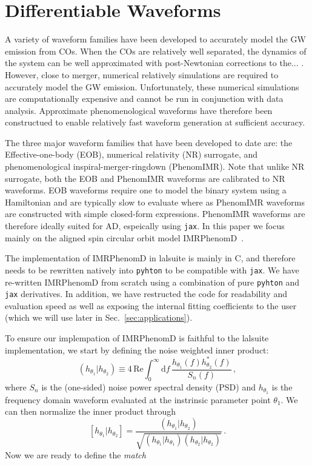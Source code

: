 \documentclass[twocolumn]{aastex631}
\begin{document}
\section{Differentiable Waveforms}
\label{sec:waveforms}

A variety of waveform families have been developed to accurately model the GW emission from COs. 
When the COs are relatively well separated, the dynamics of the system can be well approximated with post-Newtonian corrections to the... .
However, close to merger, numerical relatively simulations are required to accurately model the GW emission.
Unfortunately, these numerical simulations are computationally expensive and cannot be run in conjunction with data analysis.
Approximate phenomenological waveforms have therefore been constructued to enable relatively fast waveform generation at sufficient accuracy.

The three major waveform families that have been developed to date are: the Effective-one-body (EOB), numerical relativity (NR) surrogate, and phenomenological inspiral-merger-ringdown (PhenomIMR).
Note that unlike NR surrogate, both the EOB and PhenomIMR waveforms are calibrated to NR waveforms.
EOB waveforms require one to model the binary system using a Hamiltonian and are typically slow to evaluate where as PhenomIMR waveforms are constructed with simple closed-form expressions.
PhenomIMR waveforms are therefore ideally suited for AD, espeically using \texttt{jax}. 
In this paper we focus mainly on the aligned spin circular orbit model IMRPhenomD~\citep{Husa:2015iqa, 2015jqa}.

The implementation of IMRPhenomD in lalsuite is mainly in C, and therefore needs to be rewritten natively into \texttt{pyhton} to be compatible with \texttt{jax}.
We have re-written IMRPhenomD from scratch using a combination of pure \texttt{pyhton} and \texttt{jax} derivatives.
In addition, we have restructed the code for readability and evaluation speed as well as exposing the internal fitting coefficients to the user (which we will use later in Sec.~\ref{sec:applications}).

To ensure our implempation of IMRPhenomD is faithful to the lalsuite implementation, we start by defining the noise weighted inner product:
\begin{equation}
    \left(h_{\theta_1}|h_{\theta_2}\right) \equiv 4 \, \mathrm{Re} \int^{\infty}_{0} \mathrm{d} f \, \frac{ h_{\theta_1}(f) h^*_{\theta_2}(f)}{S_n(f)}\, ,
\end{equation}
where $S_n$ is the (one-sided) noise power spectral density (PSD) and $h_{\theta_1}$ is the frequency domain waveform evaluated at the instrinsic parameter point $\theta_1$.
We can then normalize the inner product through
\begin{equation}
    \left[h_{\theta_1}|h_{\theta_2}\right] = \frac{\left(h_{\theta_1}|h_{\theta_2}\right)}{\sqrt{\left(h_{\theta_1}|h_{\theta_1}\right)\left(h_{\theta_2}|h_{\theta_2}\right)}}\, .
\end{equation}
Now we are ready to define the \textit{match}
\end{document}
